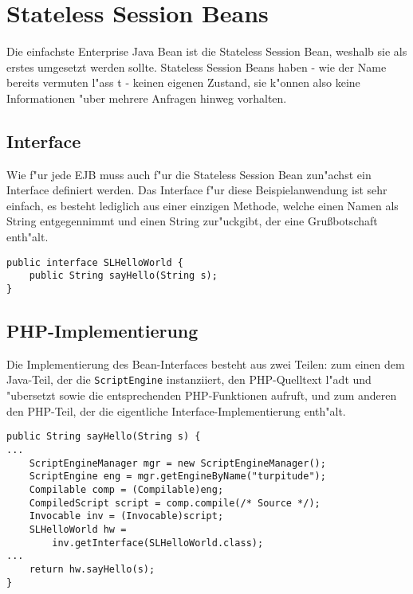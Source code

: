 \section{Stateless Session Beans}
\label{sec:chap2:slsb}

Die einfachste Enterprise Java Bean ist die Stateless Session Bean, weshalb sie als erstes umgesetzt werden sollte.
Stateless Session Beans haben - wie der Name bereits vermuten l"ass t - keinen eigenen Zustand, sie
k"onnen also keine Informationen "uber mehrere Anfragen hinweg vorhalten.

\subsection{Interface}
\label{sec:chap2:slsb:if}
Wie f"ur jede EJB muss auch f"ur die Stateless Session Bean zun"achst ein Interface definiert werden.
Das Interface f"ur diese Beispielanwendung ist sehr einfach, es besteht lediglich aus einer einzigen
Methode, welche einen Namen als String entgegennimmt und einen String zur"uckgibt, der eine
Gru\ss botschaft enth"alt. 

\begin{lstlisting}[caption=Stateless Hello World Interface]
public interface SLHelloWorld {
    public String sayHello(String s);
}
\end{lstlisting}

\subsection{PHP-Implementierung}
\label{sec:chap2:slsb:impl}

Die Implementierung des Bean-Interfaces besteht aus zwei Teilen: zum einen dem Java-Teil, der die
\texttt{ScriptEngine} instanziiert, den PHP-Quelltext l"adt und "ubersetzt sowie die entsprechenden PHP-Funktionen
aufruft, und zum anderen den PHP-Teil, der die eigentliche Interface-Implementierung enth"alt.

\begin{lstlisting}[caption=Java-Teil]
public String sayHello(String s) {
...
    ScriptEngineManager mgr = new ScriptEngineManager();
    ScriptEngine eng = mgr.getEngineByName("turpitude");
    Compilable comp = (Compilable)eng;
    CompiledScript script = comp.compile(/* Source */);
    Invocable inv = (Invocable)script;
    SLHelloWorld hw = 
        inv.getInterface(SLHelloWorld.class);
...
    return hw.sayHello(s);
}
\end{lstlisting}

